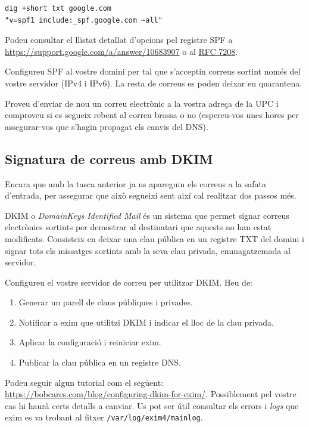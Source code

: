 \documentclass{practicaitic}
\begin{document}
\begin{verbatim}
dig +short txt google.com
"v=spf1 include:_spf.google.com ~all"
\end{verbatim}

Podeu consultar el llistat detallat d'opcions pel registre SPF a
\url{https://support.google.com/a/answer/10683907} o al
\href{https://datatracker.ietf.org/doc/html/rfc7208}{RFC 7208}.

\begin{tasca}
  Configureu SPF al vostre domini per tal que s'acceptin correus sortint només
  del vostre servidor (IPv4 i IPv6). La resta de correus es poden deixar en
  quarantena.

  Proveu d'enviar de nou un correu electrònic a la vostra adreça de la UPC
  i comproveu si es segueix rebent al correu brossa o no (espereu-vos unes hores
  per assegurar-vos que s'hagin propagat els canvis del DNS).
\end{tasca}

\subsection{Signatura de correus amb DKIM}

Encara que amb la tasca anterior ja us apareguin els correus a la safata
d'entrada, per assegurar que això segueixi sent així cal realitzar dos passos
més.

DKIM o \textit{DomainKeys Identified Mail} és un sistema que permet signar
correus electrònics sortints per demostrar al destinatari que aquests no han
estat modificats.
Consisteix en deixar una clau pública en un registre TXT del domini i signar
tots els missatges sortints amb la seva clau privada, emmagatzemada al servidor.

\begin{tasca}
  Configureu el vostre servidor de correu per utilitzar DKIM. Heu de:
  \begin{enumerate}
    \item Generar un parell de claus públiques i privades.
    \item Notificar a exim que utilitzi DKIM i indicar el lloc de la clau privada.
    \item Aplicar la configuració i reiniciar exim.
    \item Publicar la clau pública en un registre DNS.
  \end{enumerate}
\end{tasca}

Podeu seguir algun tutorial com el següent: \url{https://bobcares.com/blog/configuring-dkim-for-exim/}. Possiblement pel vostre cas hi haurà certs detalls
a canviar. Us pot ser útil consultar els errors i \textit{logs} que exim es
va trobant al fitxer \texttt{/var/log/exim4/mainlog}.
\end{document}

